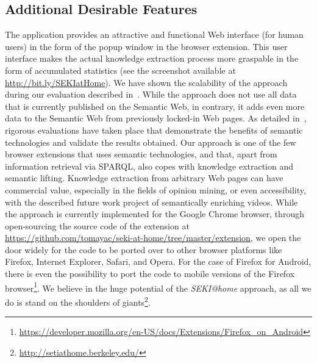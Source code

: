 \documentclass[runningheads,a4paper]{llncs}
\begin{document}
\subsection*{Additional Desirable Features}
The application provides an attractive and functional Web interface (for human users) in the form of the popup window in the browser extension.
This user interface makes the actual knowledge extraction process more graspable in the form of accumulated statistics
(see the screenshot available at \url{http://bit.ly/SEKIatHome}).
We have shown the scalability of the approach during our evaluation described in~\cite{Steiner2012SEKIatHome}.
While the approach does not use all data that is currently published on the Semantic Web, in contrary, it adds even more data to the Semantic Web
from previously locked-in Web pages.
As detailed in~\cite{Steiner2012SEKIatHome}, rigorous evaluations have taken place that demonstrate the benefits of semantic technologies and validate the results obtained.
Our approach is one of the few browser extensions that uses semantic technologies, and that, apart from information retrieval via SPARQL, also copes with knowledge extraction and semantic lifting.
Knowledge extraction from arbitrary Web pages can have commercial value,
especially in the fields of opinion mining, or even accessibility,
with the described future work project of semantically enriching videos.
While the approach is currently implemented for the Google Chrome browser,
through open-sourcing the source code of the extension at \url{https://github.com/tomayac/seki-at-home/tree/master/extension}, we open the door widely
for the code to be ported over to other browser platforms like Firefox, Internet Explorer, Safari, and Opera. For the case of Firefox for Android, there is even the possibility to port the code to mobile versions of the Firefox browser\footnote{\url{https://developer.mozilla.org/en-US/docs/Extensions/Firefox_on_Android}}.
We believe in the huge potential of the \emph{SEKI@home} approach,
as all we do is stand on the shoulders of giants\footnote{\url{http://setiathome.berkeley.edu/}}.
\end{document}
